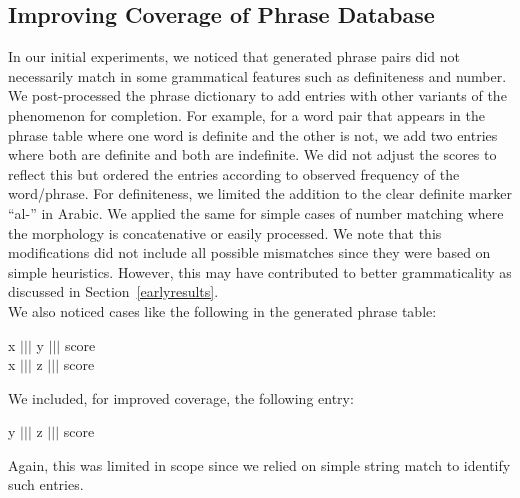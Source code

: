 \documentclass[11pt,letterpaper]{article}
\begin{document}
\subsection{Improving Coverage of Phrase Database}
In our initial experiments, we noticed that generated phrase pairs did not necessarily match in some grammatical features such as definiteness and number. We post-processed the phrase dictionary to add entries with other variants of the phenomenon for completion. For example, for a word pair that appears in the phrase table where one word is definite and the other is not, we add two entries where both are definite and both are indefinite. We did not adjust the scores to reflect this but ordered the entries according to observed frequency of the word/phrase. For definiteness, we limited the addition to the clear definite marker ``al-'' in Arabic. We applied the same for simple cases of number matching where the morphology is concatenative or easily processed. We note that this modifications did not include all  possible mismatches since they were based on simple heuristics. However, this may have contributed to better grammaticality as  discussed in Section~\ref{earlyresults}.\\
We also noticed cases like the following in the generated phrase table:
\begin{center}
x $\vert\vert\vert$ y $\vert\vert\vert$ score\\
x $\vert\vert\vert$ z $\vert\vert\vert$ score\\
\end{center}
We included, for improved coverage, the following entry:
\begin{center}
y $\vert\vert\vert$ z $\vert\vert\vert$ score\\
\end{center}
Again, this was limited in scope since we relied on simple string match to identify such entries. 
\end{document}
